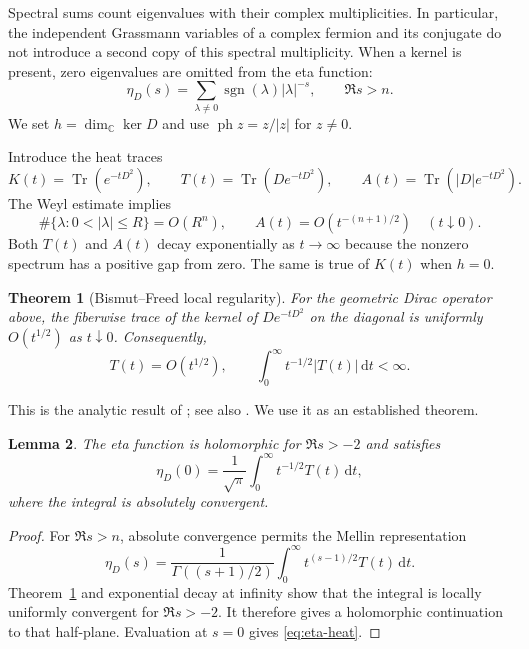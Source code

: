 \documentclass[11pt,a4paper]{article}
\newtheorem{theorem}{Theorem}[section]
\newtheorem{lemma}[theorem]{Lemma}
\theoremstyle{remark}
\DeclareMathOperator{\Tr}{Tr}
\DeclareMathOperator{\sgn}{sgn}
\DeclareMathOperator{\ph}{ph}
\newcommand{\dd}{\,\mathrm d}
\newcommand{\C}{\mathbb C}
\numberwithin{equation}{section}
\begin{document}
Spectral sums count eigenvalues with their complex multiplicities.
In particular, the independent Grassmann variables of a complex
fermion and its conjugate do not introduce a second copy of this
spectral multiplicity. When a kernel is present, zero eigenvalues are
omitted from the eta function:
\begin{equation}\label{eq:eta-def}
 \eta_D(s)=\sum_{\lambda\ne0}\sgn(\lambda)|\lambda|^{-s},
 \qquad \Re s>n.
\end{equation}
We set $h=\dim_\C\ker D$ and use $\ph z=z/|z|$ for $z\ne0$.

Introduce the heat traces
\begin{equation}\label{eq:heat-traces}
 K(t)=\Tr(e^{-tD^2}),\qquad
 T(t)=\Tr(De^{-tD^2}),\qquad
 A(t)=\Tr(|D|e^{-tD^2}).
\end{equation}
The Weyl estimate implies
\begin{equation}\label{eq:weyl}
 \#\{\lambda:0<|\lambda|\le R\}=O(R^n),\qquad
 A(t)=O(t^{-(n+1)/2})\quad(t\downarrow0).
\end{equation}
Both $T(t)$ and $A(t)$ decay exponentially as $t\to\infty$ because
the nonzero spectrum has a positive gap from zero. The same is true
of $K(t)$ when $h=0$.

\begin{theorem}[Bismut--Freed local regularity]\label{thm:BF}
For the geometric Dirac operator above, the fiberwise trace of the
kernel of $De^{-tD^2}$ on the diagonal is uniformly $O(t^{1/2})$ as
$t\downarrow0$. Consequently,
\begin{equation}\label{eq:BF}
 T(t)=O(t^{1/2}),\qquad
 \int_0^\infty t^{-1/2}|T(t)|\dd t<\infty.
\end{equation}
\end{theorem}

This is the analytic result of \cite[Theorem 2.4]{BF}; see also
\cite[Theorem 3.1]{Ponge}. We use it as an established theorem.

\begin{lemma}\label{lem:eta}
The eta function is holomorphic for $\Re s>-2$ and satisfies
\begin{equation}\label{eq:eta-heat}
 \eta_D(0)=\frac1{\sqrt\pi}\int_0^\infty t^{-1/2}T(t)\dd t,
\end{equation}
where the integral is absolutely convergent.
\end{lemma}
\begin{proof}
For $\Re s>n$, absolute convergence permits the Mellin representation
\begin{equation}\label{eq:mellin}
 \eta_D(s)=\frac1{\Gamma((s+1)/2)}
 \int_0^\infty t^{(s-1)/2}T(t)\dd t.
\end{equation}
Theorem~\ref{thm:BF} and exponential decay at infinity show that the
integral is locally uniformly convergent for $\Re s>-2$.
It therefore gives a holomorphic continuation to that half-plane.
Evaluation at $s=0$ gives \eqref{eq:eta-heat}.
\end{proof}
\end{document}
